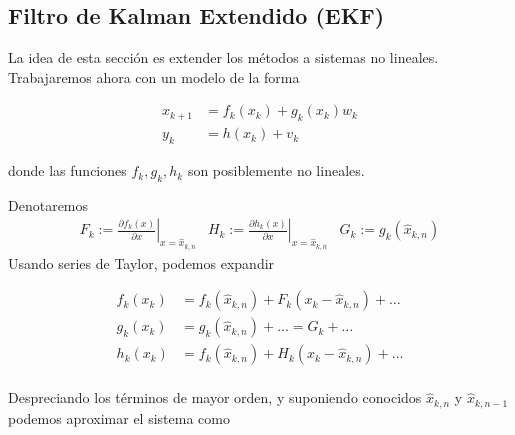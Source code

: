 



\subsection{Filtro de Kalman Extendido (EKF)}\label{filtro-extendido}


La idea de esta sección es extender los métodos a sistemas no lineales. Trabajaremos ahora con un modelo de la forma 

\begin{equation}
\begin{aligned}
x_{k+1} &= f_k(x_k) + g_k(x_k) w_k \\
y_{k} &= h(x_k) + v_k
\end{aligned}
\end{equation}

donde las funciones \(f_k, g_k, h_k\) son posiblemente no lineales. 

Denotaremos 
\begin{equation}
\begin{aligned}
F_k := \left. \frac{\partial f_k(x)}{\partial x} \right|_{x = \hat{x}_{k,n}} & H_k := \left. \frac{\partial h_k(x)}{\partial x} \right|_{x = \hat{x}_{k,n}} & G_k := g_k(\hat{x}_{k,n})
\end{aligned}
\end{equation}
Usando series de Taylor, podemos expandir 

\[
\begin{aligned}
f_k(x_k) &= f_k(\hat{x}_{k,n}) + F_k(x_k - \hat{x}_{k,n}) + \dots \\
g_k(x_k) &= g_k(\hat{x}_{k,n}) + \dots = G_k + \dots \\
h_k(x_k) &= f_k(\hat{x}_{k,n}) + H_k(x_k - \hat{x}_{k,n}) + \dots \\
\end{aligned}
\]

Despreciando los términos de mayor orden, y suponiendo conocidos \(\hat{x}_{k,n}\) y \(\hat{x}_{k,n-1}\) podemos aproximar el sistema como 

